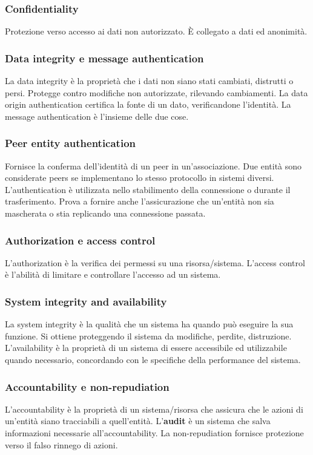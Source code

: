 \documentclass[11pt]{article}
\begin{document}
\subsubsection{Confidentiality}
Protezione verso accesso ai dati non autorizzato. È collegato a dati ed anonimità.
\subsubsection{Data integrity e message authentication}
La data integrity è la proprietà che i dati non siano stati cambiati, distrutti o persi. Protegge contro modifiche non autorizzate, rilevando cambiamenti. La data origin authentication certifica la fonte di un dato, verificandone l'identità. La message authentication è l'insieme delle due cose.
\subsubsection{Peer entity authentication}
Fornisce la conferma dell'identità di un peer in un'associazione. Due entità sono considerate peers se implementano lo stesso protocollo in sistemi diversi. L'authentication è utilizzata nello stabilimento della connessione o durante il trasferimento. Prova a fornire anche l'assicurazione che un'entità non sia mascherata o stia replicando una connessione passata.

\subsubsection{Authorization e access control}
L'authorization è la verifica dei permessi su una risorsa/sistema. L'access control è l'abilità di limitare e controllare l'accesso ad un sistema. 
\subsubsection{System integrity and availability}
La system integrity è la qualità che un sistema ha quando può eseguire la sua funzione. Si ottiene proteggendo il sistema da modifiche, perdite, distruzione. L'availability è la proprietà di un sistema di essere accessibile ed utilizzabile quando necessario, concordando con le specifiche della performance del sistema. 
\subsubsection{Accountability e non-repudiation}
L'accountability è la proprietà di un sistema/risorsa che assicura che le azioni di un'entità siano tracciabili a quell'entità. L'\textbf{audit} è un sistema che salva informazioni necessarie all'accountability.
La non-repudiation fornisce protezione verso il falso rinnego di azioni. 
\end{document}
